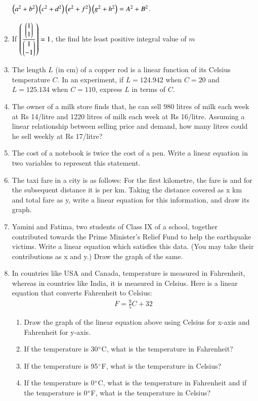 \begin{enumerate}[label=\arabic*.,ref=\thesubsection.\theenumi]
$\left(a^2+b^2\right)\left(c^2+d^2\right)\left(e^2+f^2\right)\left(g^2+h^2\right)=A^2+B^2$.
\item If $\left(\frac{\begin{pmatrix}1\\1\end{pmatrix}}{\begin{pmatrix}1\\-1\end{pmatrix}}\right)=1$,  the find hte least positive integral value of $m$\item The length $L$ (in cm) of a copper rod is a linear function of its Celsius temperature $C$.  In an experiment, if $L=124.942$  when $C=20$ and $L=125.134$ when $C = 110$, express $L$ in terms of $C$.
%
\item The owner of a milk store finds that, he can sell 980 litres of milk each week at Rs 14/litre and 1220 litres of milk each week at Rs 16/litre. Assuming a linear relationship between selling price and demand, how many litres could he sell weekly at Rs 17/litre?
\item The cost of a notebook is twice the cost of a pen. Write a linear equation in two variables to represent this statement.
%
\item  The taxi fare in a city is as follows: For the first kilometre, the fare is  and for the subsequent distance it is  per km. Taking the distance covered as x km and total fare as \rupee y, write a linear equation for this information, and draw its graph.%
%
\item Yamini and Fatima, two students of Class IX of a school, together contributed  towards the Prime Minister’s Relief Fund to help the earthquake victims. Write a linear equation which satisfies this data. (You may take their contributions as \rupee x and \rupee y.) Draw the graph of the same.
\item In countries like USA and Canada, temperature is measured in Fahrenheit, whereas in countries like India, it is measured in Celsius. Here is a linear equation that converts Fahrenheit to Celsius:
%
\begin{align}
F =\frac{9}{ 5}C + 32
\end{align}
\begin{enumerate}
\item  Draw the graph of the linear equation above using Celsius for x-axis and Fahrenheit for y-axis.
\item If the temperature is 30$\degree$C, what is the temperature in Fahrenheit? 
\item If the temperature is 95$\degree$F, what is the temperature in Celsius? 
\item If the temperature is 0$\degree$C, what is the temperature in Fahrenheit and if the temperature is 0$\degree$F, what is the temperature in Celsius?

\end{enumerate}
\end{enumerate}
